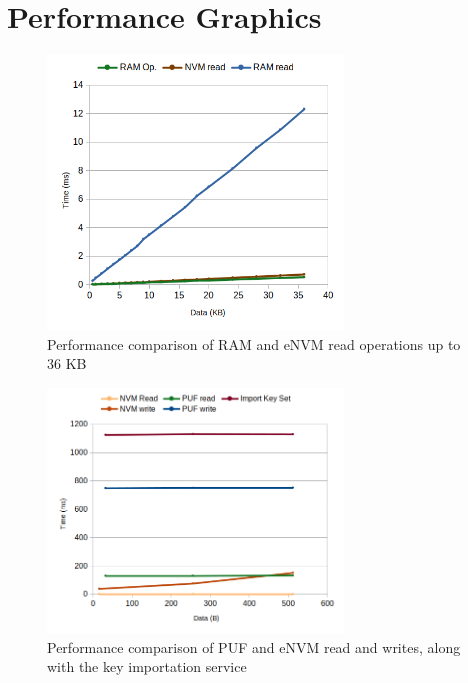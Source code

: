 \chapter{Performance Graphics}
\label{chap:appendixB}

\begin{figure}[h!]
	\centering
	\includegraphics[width=0.7\textwidth]{./Images/memory-time.png}
	\caption{Performance comparison of RAM and eNVM read operations up to 36 KB}
	\label{fig:performance:memory-time}
\end{figure}

\begin{figure}[h!]
	\centering
	\includegraphics[width=0.7\textwidth]{./Images/nvm-puf-time.png}
	\caption{Performance comparison of PUF and eNVM read and writes, along with the key importation service}
	\label{fig:performance:nvm-puf-time}
\end{figure}

